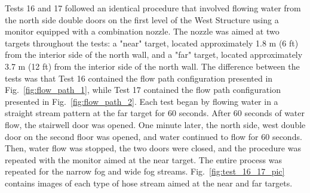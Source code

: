 \documentclass[12pt,oneside]{book}
\begin{document}
Tests 16 and 17 followed an identical procedure that involved flowing water from the north side double doors on the first level of the West Structure using a monitor equipped with a combination nozzle. The nozzle was aimed at two targets throughout the tests: a "near" target, located approximately 1.8 m (6 ft) from the interior side of the north wall, and a "far" target, located approximately 3.7 m (12 ft) from the interior side of the north wall. The difference between the tests was that Test 16 contained the flow path configuration presented in Fig.~\ref{fig:flow_path_1}, while Test 17 contained the flow path configuration presented in Fig.~\ref{fig:flow_path_2}. Each test began by flowing water in a straight stream pattern at the far target for 60 seconds. After 60 seconds of water flow, the stairwell door was opened. One minute later, the north side, west double door on the second floor was opened, and water continued to flow for 60 seconds. Then, water flow was stopped, the two doors were closed, and the procedure was repeated with the monitor aimed at the near target. The entire process was repeated for the narrow fog and wide fog streams. Fig.~\ref{fig:test_16_17_pic} contains images of each type of hose stream aimed at the near and far targets.
\end{document}
